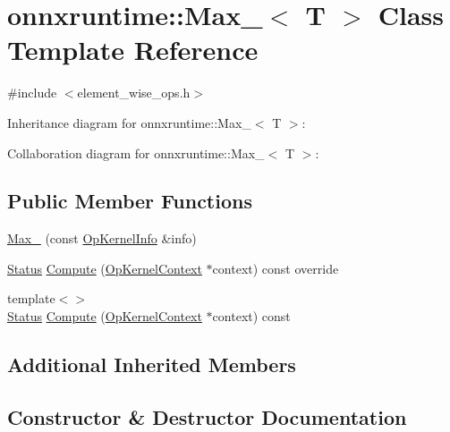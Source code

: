 \hypertarget{classonnxruntime_1_1Max__8}{}\section{onnxruntime\+:\+:Max\+\_$<$ T $>$ Class Template Reference}
\label{classonnxruntime_1_1Max__8}


{\ttfamily \#include $<$element\+\_\+wise\+\_\+ops.\+h$>$}



Inheritance diagram for onnxruntime\+:\+:Max\+\_$<$ T $>$\+:


Collaboration diagram for onnxruntime\+:\+:Max\+\_$<$ T $>$\+:
\subsection*{Public Member Functions}
\begin{DoxyCompactItemize}
\item 
\mbox{\hyperlink{classonnxruntime_1_1Max__8_a0997d8f4503b464dfcd108bf062292b0}{Max\+\_}} (const \mbox{\hyperlink{classonnxruntime_1_1OpKernelInfo}{Op\+Kernel\+Info}} \&info)
\item 
\mbox{\hyperlink{classonnxruntime_1_1common_1_1Status}{Status}} \mbox{\hyperlink{classonnxruntime_1_1Max__8_a85e0e730c4d7b14e86e876f669857ad4}{Compute}} (\mbox{\hyperlink{classonnxruntime_1_1OpKernelContext}{Op\+Kernel\+Context}} $\ast$context) const override
\item 
{\footnotesize template$<$$>$ }\\\mbox{\hyperlink{classonnxruntime_1_1common_1_1Status}{Status}} \mbox{\hyperlink{classonnxruntime_1_1Max__8_a26b6cd6fce65849eab03bd3979782167}{Compute}} (\mbox{\hyperlink{classonnxruntime_1_1OpKernelContext}{Op\+Kernel\+Context}} $\ast$context) const
\end{DoxyCompactItemize}
\subsection*{Additional Inherited Members}


\subsection{Constructor \& Destructor Documentation}
\mbox{\label{classonnxruntime_1_1Max__8_a0997d8f4503b464dfcd108bf062292b0}} 
